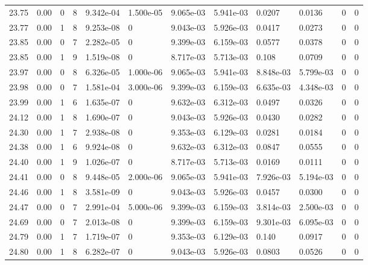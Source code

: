 \documentclass[preview]{standalone}
\begin{document}
{{{{{{{{{\begin{tabular}{L{1.2cm}C{1.2cm} C{0.3cm}C{0.5cm} C{1.4cm}C{1.4cm} C{1.4cm}C{1.4cm} C{1.6cm}C{1.6cm} C{1.6cm}C{1.6cm}}
  23.75  &  0.00  & 0     &  8 &  9.342e-04  & 1.500e-05  &  9.065e-03&   5.941e-03& 0.0207 & 0.0136   &  0 & 0  \\ 
  23.77  &  0.00  & 1     &  8 &  9.253e-08  & 0  &  9.043e-03&   5.926e-03& 0.0417 & 0.0273   &  0 & 0  \\ 
  23.85  &  0.00  & 0     &  7 &  2.282e-05  & 0  &  9.399e-03&   6.159e-03& 0.0577 & 0.0378   &  0 & 0  \\ 
  23.85  &  0.00  & 1     &  9 &  1.519e-08  & 0  &  8.717e-03&   5.713e-03& 0.108 & 0.0709   &  0 & 0  \\ 
  23.97  &  0.00  & 0     &  8 &  6.326e-05  & 1.000e-06  &  9.065e-03&   5.941e-03& 8.848e-03 & 5.799e-03   &  0 & 0  \\ 
  23.98  &  0.00  & 0     &  7 &  1.581e-04  & 3.000e-06  &  9.399e-03&   6.159e-03& 6.635e-03 & 4.348e-03   &  0 & 0  \\ 
  23.99  &  0.00  & 1     &  6 &  1.635e-07  & 0  &  9.632e-03&   6.312e-03& 0.0497 & 0.0326   &  0 & 0  \\ 
  24.12  &  0.00  & 1     &  8 &  1.690e-07  & 0  &  9.043e-03&   5.926e-03& 0.0430 & 0.0282   &  0 & 0  \\ 
  24.30  &  0.00  & 1     &  7 &  2.938e-08  & 0  &  9.353e-03&   6.129e-03& 0.0281 & 0.0184   &  0 & 0  \\ 
  24.38  &  0.00  & 1     &  6 &  9.924e-08  & 0  &  9.632e-03&   6.312e-03& 0.0847 & 0.0555   &  0 & 0  \\ 
  24.40  &  0.00  & 1     &  9 &  1.026e-07  & 0  &  8.717e-03&   5.713e-03& 0.0169 & 0.0111   &  0 & 0  \\ 
  24.41  &  0.00  & 0     &  8 &  9.448e-05  & 2.000e-06  &  9.065e-03&   5.941e-03& 7.926e-03 & 5.194e-03   &  0 & 0  \\ 
  24.46  &  0.00  & 1     &  8 &  3.581e-09  & 0  &  9.043e-03&   5.926e-03& 0.0457 & 0.0300   &  0 & 0  \\ 
  24.47  &  0.00  & 0     &  7 &  2.991e-04  & 5.000e-06  &  9.399e-03&   6.159e-03& 3.814e-03 & 2.500e-03   &  0 & 0  \\ 
  24.69  &  0.00  & 0     &  7 &  2.013e-08  & 0  &  9.399e-03&   6.159e-03& 9.301e-03 & 6.095e-03   &  0 & 0  \\ 
  24.79  &  0.00  & 1     &  7 &  1.719e-07  & 0  &  9.353e-03&   6.129e-03& 0.140 & 0.0917   &  0 & 0  \\ 
  24.80  &  0.00  & 1     &  8 &  6.282e-07  & 0  &  9.043e-03&   5.926e-03& 0.0803 & 0.0526   &  0 & 0  \\ 

\end{tabular}}}}}}}}}}
\end{document}

